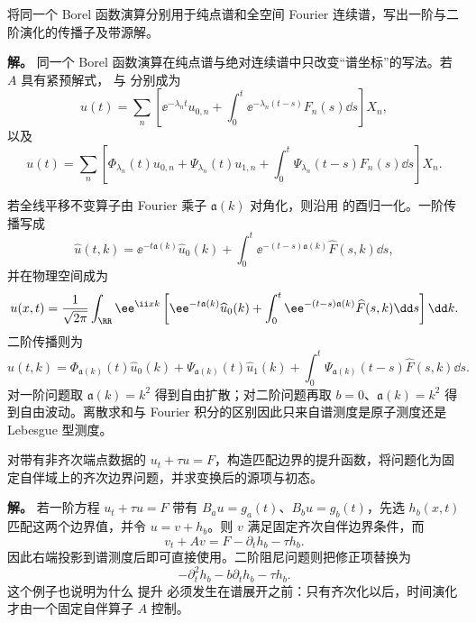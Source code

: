 \begin{exbox}
\label{ex:math-sl-first-abstract-general}
\label{ex:math-sl-second-abstract-general}
\label{ex:math-sl-fourier-first-general}
\label{ex:math-sl-fourier-second-general}
将同一个 Borel 函数演算分别用于纯点谱和全空间 Fourier 连续谱，写出一阶与二阶演化的传播子及带源解。

\textbf{解。} 同一个 Borel 函数演算在纯点谱与绝对连续谱中只改变“谱坐标”的写法。若 $A$ 具有紧预解式， 与 分别成为
\begin{equation*}u(t)=\sum_n\left[
 \ee^{-\lambda_nt}u_{0,n}
 +\int_0^t\ee^{-\lambda_n(t-s)}F_n(s)\dd s
 \right]X_n,
\end{equation*}
以及
\begin{equation*}u(t)=\sum_n\left[
 \Phi_{\lambda_n}(t)u_{0,n}
 +\Psi_{\lambda_n}(t)u_{1,n}
 +\int_0^t\Psi_{\lambda_n}(t-s)F_n(s)\dd s
 \right]X_n.
\end{equation*}

若全线平移不变算子由 Fourier 乘子 $\mathfrak a(k)$ 对角化，则沿用 的酉归一化。一阶传播写成
\begin{equation*}\widehat u(t,k)=\ee^{-t\mathfrak a(k)}\widehat u_0(k)
 +\int_0^t\ee^{-(t-s)\mathfrak a(k)}\widehat F(s,k)\dd s,
\end{equation*}
并在物理空间成为
\begin{equation*}u(x,t)=\frac{1}{\sqrt{2\pi}}\int_{\RR}\ee^{\ii xk}
 \left[\ee^{-t\mathfrak a(k)}\widehat u_0(k)
 +\int_0^t\ee^{-(t-s)\mathfrak a(k)}\widehat F(s,k)\dd s\right]\dd k.
\end{equation*}
二阶传播则为
\begin{equation*}\widehat u(t,k)=\Phi_{\mathfrak a(k)}(t)\widehat u_0(k)
 +\Psi_{\mathfrak a(k)}(t)\widehat u_1(k)
 +\int_0^t\Psi_{\mathfrak a(k)}(t-s)\widehat F(s,k)\dd s.
\end{equation*}
对一阶问题取 $\mathfrak a(k)=k^2$ 得到自由扩散；对二阶问题再取 $b=0$、$\mathfrak a(k)=k^2$ 得到自由波动。离散求和与 Fourier 积分的区别因此只来自谱测度是原子测度还是 Lebesgue 型测度。
\end{exbox}

\begin{exbox}[含时非齐次边界条件的齐次化]
\label{ex:math-sl-time-lifting-template}
对带有非齐次端点数据的 $u_t+\tau u=F$，构造匹配边界的提升函数，将问题化为固定自伴域上的齐次边界问题，并求变换后的源项与初态。

\textbf{解。} 若一阶方程 $u_t+\tau u=F$ 带有 $B_au=g_a(t)$、$B_bu=g_b(t)$，先选 $h_b(x,t)$ 匹配这两个边界值，并令 $u=v+h_b$。则 $v$ 满足固定齐次自伴边界条件，而
\[
 v_t+Av=F-\partial_t h_b-\tau h_b.
\]
因此右端投影到谱测度后即可直接使用。二阶阻尼问题则把修正项替换为
\[
 -\partial_t^2h_b-b\partial_t h_b-\tau h_b.
\]
这个例子也说明为什么 提升 必须发生在谱展开之前：只有齐次化以后，时间演化才由一个固定自伴算子 $A$ 控制。
\end{exbox}


